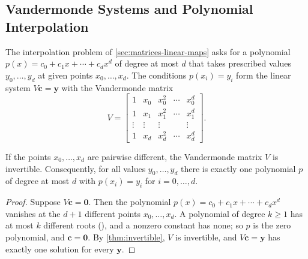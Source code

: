 \subsection{Vandermonde Systems and Polynomial Interpolation}

The interpolation problem of \cref{sec:matrices-linear-maps} asks for a polynomial $p(x)=c_0+c_1x+\cdots+c_dx^d$ of degree at most $d$ that takes prescribed values $y_0,\ldots,y_d$ at given points $x_0,\ldots,x_d$. The conditions $p(x_i)=y_i$ form the linear system $V\mathbf c=\mathbf y$ with the Vandermonde matrix
\[
V=\begin{bmatrix}1&x_0&x_0^2&\cdots&x_0^d\\1&x_1&x_1^2&\cdots&x_1^d\\\vdots&\vdots&\vdots&&\vdots\\1&x_d&x_d^2&\cdots&x_d^d\end{bmatrix}.
\]

\begin{theorem}
\label{thm:interpolation}
If the points $x_0,\ldots,x_d$ are pairwise different, the Vandermonde matrix $V$ is invertible. Consequently, for all values $y_0,\ldots,y_d$ there is exactly one polynomial $p$ of degree at most $d$ with $p(x_i)=y_i$ for $i=0,\ldots,d$.
\end{theorem}

\begin{proof}
Suppose $V\mathbf c=\mathbf 0$. Then the polynomial $p(x)=c_0+c_1x+\cdots+c_dx^d$ vanishes at the $d+1$ different points $x_0,\ldots,x_d$. A polynomial of degree $k\ge1$ has at most $k$ different roots (), and a nonzero constant has none; so $p$ is the zero polynomial, and $\mathbf c=\mathbf 0$. By \cref{thm:invertible}, $V$ is invertible, and $V\mathbf c=\mathbf y$ has exactly one solution for every $\mathbf y$.
\end{proof}

